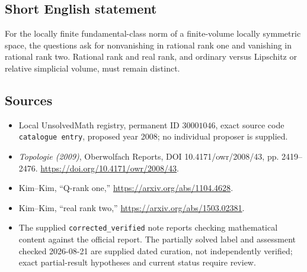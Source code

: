 \documentclass[11pt]{article}
\begin{document}
\subsection{Short English statement}
For the locally finite fundamental-class norm of a finite-volume locally symmetric space, the questions ask for nonvanishing in rational rank one and vanishing in rational rank two. Rational rank and real rank, and ordinary versus Lipschitz or relative simplicial volume, must remain distinct.
\subsection{Sources}
\begin{itemize}
\item Local UnsolvedMath registry, permanent ID \(30001046\), exact source code \texttt{catalogue entry}, proposed year 2008; no individual proposer is supplied.
\item \emph{Topologie (2009)}, Oberwolfach Reports, DOI 10.4171/owr/2008/43, pp. 2419--2476. \url{https://doi.org/10.4171/owr/2008/43}.
\item Kim--Kim, ``Q-rank one,'' \url{https://arxiv.org/abs/1104.4628}.
\item Kim--Kim, ``real rank two,'' \url{https://arxiv.org/abs/1503.02381}.
\item The supplied \texttt{corrected\_verified} note reports checking mathematical content against the official report. The partially solved label and assessment checked 2026-08-21 are supplied dated curation, not independently verified; exact partial-result hypotheses and current status require review.
\end{itemize}
\end{document}
